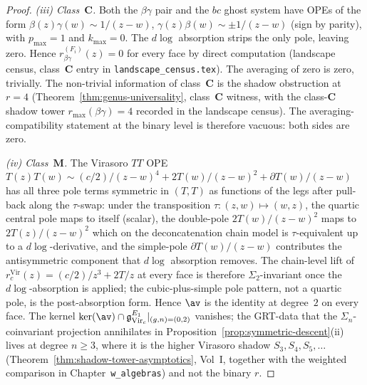 \begin{proof}
\smallskip
\emph{(iii) Class~$\mathbf{C}$.} Both the $\beta\gamma$ pair
and the $bc$ ghost system have OPEs of the form
$\beta(z)\gamma(w) \sim 1/(z-w)$, $\gamma(z)\beta(w) \sim
\pm 1/(z-w)$ (sign by parity), with $p_{\max} = 1$ and
$k_{\max} = 0$. The $d\log$ absorption strips the only pole,
leaving zero. Hence $r_{\beta\gamma}^{(F_i)}(z) = 0$ for
every face by direct computation (landscape census,
class~$\mathbf{C}$ entry in
\texttt{landscape\_census.tex}). The averaging of zero is
zero, trivially. The non-trivial information of class~$\mathbf{C}$
is the shadow obstruction at $r = 4$
(Theorem~\ref{thm:genus-universality}, class~$\mathbf{C}$
witness, with the class-$\mathbf{C}$ shadow tower
$r_{\max}(\beta\gamma) = 4$
recorded in the landscape census). The averaging-compatibility
statement at the binary level is therefore vacuous: both sides
are zero.

\smallskip
\emph{(iv) Class~$\mathbf{M}$.} The Virasoro $TT$ OPE
$T(z)T(w) \sim (c/2)/(z-w)^4 + 2T(w)/(z-w)^2 + \partial T(w)/(z-w)$
has all three pole terms symmetric in $(T, T)$ as functions
of the legs after pull-back along the $\tau$-swap: under
the transposition $\tau\colon (z, w) \mapsto (w, z)$, the
quartic central pole maps to itself (scalar), the double-pole
$2T(w)/(z-w)^2$ maps to $2T(z)/(z-w)^2$ which on the
deconcatenation chain model is $\tau$-equivalent up to a
$d\log$-derivative, and the simple-pole $\partial T(w)/(z-w)$
contributes the antisymmetric component that $d\log$
absorption removes. The chain-level lift of
$r^{\mathrm{Vir}}_c(z) = (c/2)/z^3 + 2T/z$ at every face is therefore
$\Sigma_2$-invariant once the
$d\log$-absorption is applied; the cubic-plus-simple pole pattern,
not a quartic pole, is the post-absorption form. Hence $\av$ is the
identity at degree~$2$ on every
face. The kernel
$\ker(\av) \cap \mathfrak{g}_{\mathrm{Vir}_c}^{E_1}|_{(g,n) = (0,2)}$
vanishes; the GRT-data that the $\Sigma_n$-coinvariant
projection annihilates in
Proposition~\ref{prop:symmetric-descent}(ii) lives at
degree $n \geq 3$, where it is the higher Virasoro shadow
$S_3, S_4, S_5, \dots$
(Theorem~\ref{thm:shadow-tower-asymptotics}, Vol~I, together with the
weighted comparison in Chapter~\texttt{w\_algebras})
and not the binary $r$.
\end{proof}

